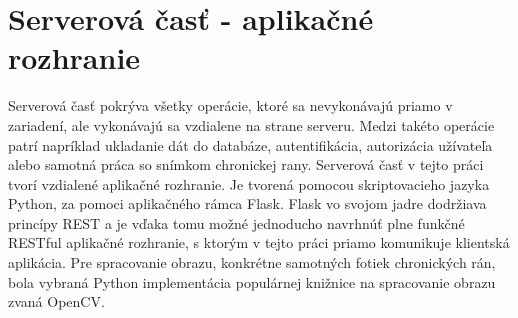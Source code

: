 \section{Serverová časť - aplikačné rozhranie}
Serverová časť pokrýva všetky operácie, ktoré sa nevykonávajú priamo v zariadení, ale vykonávajú sa vzdialene na strane serveru. Medzi takéto operácie patrí napríklad ukladanie dát do databáze, autentifikácia, autorizácia užívateľa alebo samotná práca so snímkom chronickej rany. Serverová časť v tejto práci tvorí vzdialené aplikačné rozhranie. Je tvorená pomocou skriptovacieho jazyka Python, za pomoci aplikačného rámca Flask. Flask vo svojom jadre dodržiava princípy REST a je vďaka tomu možné jednoducho navrhnúť plne funkčné RESTful aplikačné rozhranie, s ktorým v tejto práci priamo komunikuje klientská aplikácia. Pre spracovanie obrazu, konkrétne samotných fotiek chronických rán, bola vybraná Python implementácia populárnej knižnice na spracovanie obrazu zvaná OpenCV.
